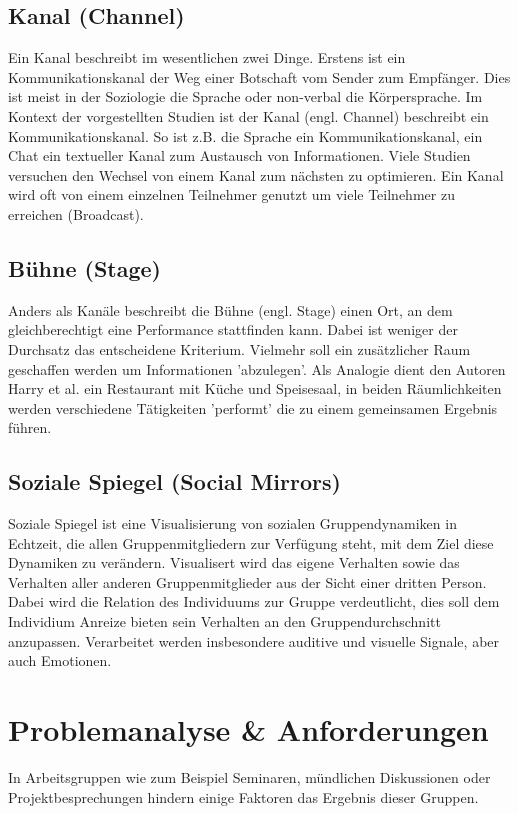 \documentclass{seminarvorlage}
\begin{document}
\subsection{Kanal (Channel)}
Ein Kanal beschreibt im wesentlichen zwei Dinge. Erstens ist ein
Kommunikationskanal der Weg einer Botschaft vom Sender zum Empfänger. Dies ist
meist in der Soziologie die Sprache oder non-verbal die Körpersprache.
Im Kontext der vorgestellten Studien ist der Kanal (engl. Channel) beschreibt
ein Kommunikationskanal. So ist z.B. die Sprache ein Kommunikationskanal, ein
Chat ein textueller Kanal zum Austausch von Informationen. Viele Studien
versuchen den Wechsel von einem Kanal zum nächsten zu optimieren. Ein Kanal wird
oft von einem einzelnen Teilnehmer genutzt um viele Teilnehmer zu erreichen
(Broadcast).

\subsection{Bühne (Stage)}
Anders als Kanäle beschreibt die Bühne (engl. Stage) einen Ort, an dem
gleichberechtigt eine Performance stattfinden kann. Dabei ist weniger der
Durchsatz das entscheidene Kriterium. Vielmehr soll ein zusätzlicher Raum
geschaffen werden um Informationen 'abzulegen'. Als Analogie dient den Autoren
Harry et al. ein Restaurant mit Küche und Speisesaal, in beiden Räumlichkeiten
werden verschiedene Tätigkeiten 'performt' die zu einem gemeinsamen Ergebnis
führen.

\subsection{Soziale Spiegel (Social Mirrors)}
Soziale Spiegel \cite{BergKara2009-2} ist eine Visualisierung von sozialen
Gruppendynamiken in Echtzeit, die allen Gruppenmitgliedern zur Verfügung steht,
mit dem Ziel diese Dynamiken zu verändern. Visualisert wird das eigene Verhalten
sowie das Verhalten aller anderen Gruppenmitglieder aus der Sicht einer dritten
Person. Dabei wird die Relation des Individuums zur Gruppe verdeutlicht, dies
soll dem Individium Anreize bieten sein Verhalten an den Gruppendurchschnitt
anzupassen. Verarbeitet werden insbesondere auditive und visuelle Signale, aber
auch Emotionen.

\section{Problemanalyse \& Anforderungen}
In Arbeitsgruppen wie zum Beispiel Seminaren, mündlichen Diskussionen oder
Projektbesprechungen hindern einige Faktoren das Ergebnis dieser Gruppen.
\end{document}
